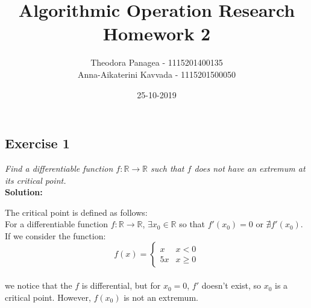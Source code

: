 \documentclass[12pt]{article}
\title{Algorithmic Operation Research \\ Homework 2}
\date{25-10-2019}
\author{Theodora Panagea - 1115201400135 \\ Anna-Aikaterini Kavvada - 1115201500050}
\newcommand{\R}{\mathbb{R}}
\begin{document}
	\maketitle{}
  	

\subsection*{Exercise 1}
\textit{Find a differentiable function $f: \R \rightarrow \R$ such that $f$ does not have an extremum at its critical point. }\\
\textbf{Solution:} \par
The critical point is defined as follows: \\
For a differentiable function $f :\R \rightarrow \R$,  $\exists  x_0 \in \R$  so that $f'(x_0) = 0$ or $\nexists f'(x_0).$ \\
If we consider the function: \\
$$f(x) = 
  \begin{cases} 
      x & x < 0 \\
      5x &  x \geqslant 0 
   \end{cases}
$$ \\
we notice that the $f$ is differential, but for $x_0 = 0$, $f'$ doesn't exist, so $x_0$ is a critical point. However, $f(x_0)$ is not an extremum. 
\newpage

\end{document}
